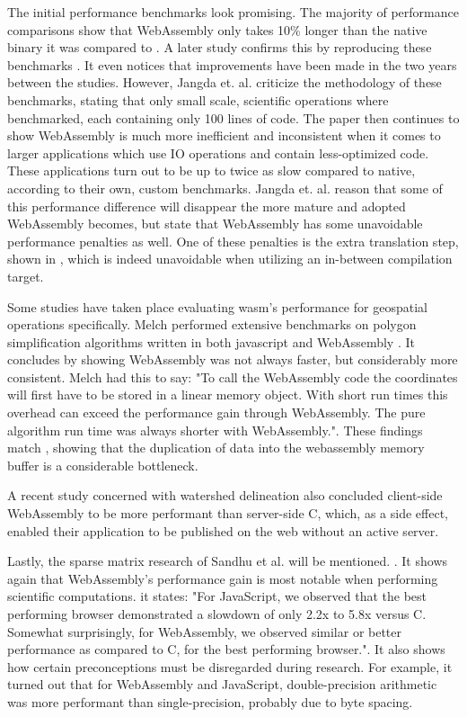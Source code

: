 The initial performance benchmarks look promising. The majority of performance comparisons show that WebAssembly only takes 10\% longer than the native binary it was compared to \cite{haas_bringing_2017}. A later study confirms this by reproducing these benchmarks \cite{jangda_not_2019}. It even notices that improvements have been made in the two years between the studies. However, Jangda et. al. criticize the methodology of these benchmarks, stating that only small scale, scientific operations where benchmarked, each containing only 100 lines of code. The paper then continues to show WebAssembly is much more inefficient and inconsistent when it comes to larger applications which use IO operations and contain less-optimized code. These applications turn out to be up to twice as slow compared to native, according to their own, custom benchmarks. 
Jangda et. al. reason that some of this performance difference will disappear the more mature and adopted WebAssembly becomes, but state that WebAssembly has some unavoidable performance penalties as well. 
One of these penalties is the extra translation step, shown in , which is indeed unavoidable when utilizing an in-between compilation target. 

Some studies have taken place evaluating \ac{wasm}'s performance for geospatial operations specifically. 
Melch performed extensive benchmarks on polygon simplification algorithms written in both javascript and WebAssembly \cite{melch_performance_2019}. 
It concludes by showing WebAssembly was not always faster, but considerably more consistent. 
Melch had this to say: "To call the WebAssembly code the coordinates will first have to be stored in a linear memory object. 
With short run times this overhead can exceed the performance gain through WebAssembly. 
The pure algorithm run time was always shorter with WebAssembly.". 
These findings match \cite{jangda_not_2019}, showing that the duplication of data into the webassembly memory buffer is a considerable bottleneck.

A recent study concerned with watershed delineation \cite{sit_optimized_2019} also concluded client-side WebAssembly to be more performant than server-side C, which, as a side effect, enabled their application to be published on the web without an active server. 

Lastly, the sparse matrix research of Sandhu et al. will be mentioned. \cite{sandhu_sparse_2018}. It shows again that WebAssembly's performance gain is most notable when performing scientific computations. it states: "For JavaScript, we observed that the best performing browser demonstrated a slowdown of only 2.2x to 5.8x versus C. Somewhat surprisingly, for WebAssembly, we observed similar or better performance as compared to C, for the best performing browser.". It also shows how certain preconceptions must be disregarded during research. For example, it turned out that for WebAssembly and JavaScript, double-precision arithmetic was more performant than single-precision, probably due to byte spacing.

